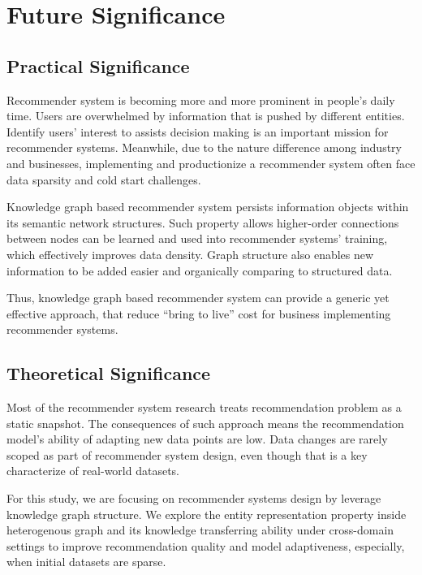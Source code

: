 \section{Future Significance}

\subsection{Practical Significance}
Recommender system is becoming more and more prominent in people's daily time. Users are overwhelmed by information that is pushed by different entities. Identify users' interest to assists decision making is an important mission for recommender systems. Meanwhile, due to the nature difference among industry and businesses, implementing and productionize a recommender system often face data sparsity and cold start challenges.  

Knowledge graph based recommender system persists information objects within its semantic network structures. Such property allows higher-order connections between nodes can be learned and used into recommender systems' training, which effectively improves data density. Graph structure also enables new information to be added easier and organically comparing to structured data.  

Thus, knowledge graph based recommender system can provide a generic yet effective approach, that reduce “bring to live” cost for business implementing recommender systems. 

\subsection{Theoretical Significance}
Most of the recommender system research treats recommendation problem as a static snapshot. The consequences of such approach means the recommendation model's ability of adapting new data points are low. Data changes are rarely scoped as part of recommender system design, even though that is a key characterize of real-world datasets. 

For this study, we are focusing on recommender systems design by leverage knowledge graph structure. We explore the entity representation property inside heterogenous graph and its knowledge transferring ability under cross-domain settings to improve recommendation quality and model adaptiveness, especially, when initial datasets are sparse.


